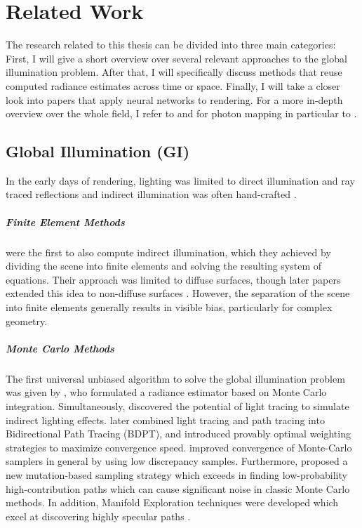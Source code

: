 
\chapter{Related Work}
\label{chap:related}
The research related to this thesis can be divided into three main categories:
First, I will give a short overview over several relevant approaches to the global illumination problem.
After that, I will specifically discuss methods that reuse computed radiance estimates across time or space.
Finally, I will take a closer look into papers that apply neural networks to rendering.
For a more in-depth overview over the whole field, I refer to \textcite{ritschel2012} and for photon mapping in particular to \textcite{kang2016}.

\section{Global Illumination (GI)}
In the early days of rendering, lighting was limited to direct illumination and ray traced reflections \parencite{whitted1980} and indirect illumination was often hand-crafted \parencite{christensen2016}.

\paragraph{Finite Element Methods}
\textcite{goral1984} were the first to also compute indirect illumination, which they achieved by dividing the scene into finite elements and solving the resulting system of equations.
Their approach was limited to diffuse surfaces, though later papers extended this idea to non-diffuse surfaces \parencite{immel1986}.
However, the separation of the scene into finite elements generally results in visible bias, particularly for complex geometry.

\paragraph{Monte Carlo Methods}
The first universal unbiased algorithm to solve the global illumination problem was given by \textcite{kajiya1986}, who formulated a radiance estimator based on Monte Carlo integration.
Simultaneously, \textcite{arvo1986} discovered the potential of light tracing to simulate indirect lighting effects.
\textcite{lafortune1993} later combined light tracing and path tracing into Bidirectional Path Tracing (BDPT), and \textcite{veach1997} introduced provably optimal weighting strategies to maximize convergence speed.
\textcite{keller1995,owen1995} improved convergence of Monte-Carlo samplers in general by using low discrepancy samples.
Furthermore, \textcite{veach1997a} proposed a new mutation-based sampling strategy which exceeds in finding low-probability high-contribution paths which can cause significant noise in classic Monte Carlo methods.
In addition, Manifold Exploration techniques were developed which excel at discovering highly specular paths \parencite{jakob2012}.


